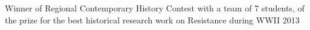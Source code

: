 
\begin{cvhonors}

  \cvhonor
    {Winner of Regional Contemporary History Contest} %
    {with a team of 7 students, of the prize for the best historical research work on Resistance during WWII} %
    {} %
    {2013} %

\end{cvhonors}
